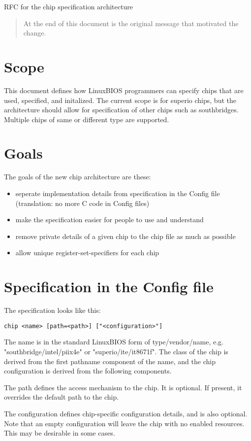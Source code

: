 		RFC for the chip specification architecture

\begin{abstract}
At the end of this document is the original message that motivated the
change.
\end{abstract}

\section{Scope}
This document defines how LinuxBIOS programmers can specify chips that
are used, specified, and initalized. The current scope is for superio
chips, but the architecture should allow for specification of other chips such
as southbridges. Multiple chips of same or different type are supported.

\section{Goals}
The goals of the new chip architecture are these:
\begin{itemize}
\item seperate implementation details from specification in the Config file
(translation: no more C code in Config files)
\item make the specification easier for people to use and understand
\item remove private details of a given chip to the chip file as much
as possible
\item allow unique register-set-specifiers for each chip
\end{itemize}

\section{Specification in the Config file}
The specification looks like this:
\begin{verbatim}
chip <name> [path=<path>] ["<configuration>"]
\end{verbatim}
The name is in the standard LinuxBIOS form of type/vendor/name, e.g.
"southbridge/intel/piix4e" or "superio/ite/it8671f". The class of the
chip is derived from the first pathname component of the name, and the chip
configuration is derived from the following components.

The path defines the access mechanism to the chip.
It is optional. If present, it overrides the default path to the chip.

The configuration defines chip-specific configuration details, and is also
optional. Note that an empty configuration will leave the chip with
no enabled resources. This may be desirable in some cases.

